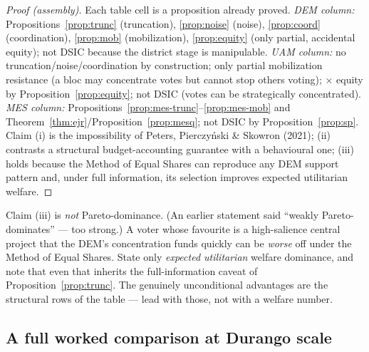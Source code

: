 \documentclass[11pt,letterpaper]{article}
\theoremstyle{definition}
\theoremstyle{plain}
\theoremstyle{remark}
\providecommand{\citet}[1]{Peters, Pierczy\'nski \& Skowron (2021)}
\begin{document}
\begin{proof}[Proof (assembly)]
Each table cell is a proposition already proved. \emph{DEM column:} Propositions~\ref{prop:trunc}
(truncation), \ref{prop:noise} (noise), \ref{prop:coord} (coordination), \ref{prop:mob}
(mobilization), \ref{prop:equity} (only partial, accidental equity); not DSIC because the district
stage is manipulable. \emph{UAM column:} no truncation/noise/coordination by construction; only
partial mobilization resistance (a bloc may concentrate votes but cannot stop others voting);
$\times$ equity by Proposition~\ref{prop:equity}; not DSIC (votes can be strategically concentrated).
\emph{MES column:} Propositions~\ref{prop:mes-trunc}--\ref{prop:mes-mob} and
Theorem~\ref{thm:ejr}/Proposition~\ref{prop:mesq}; not DSIC by Proposition~\ref{prop:sp}. Claim (i)
is the impossibility of \citet{peters2021}; (ii) contrasts a structural budget-accounting guarantee
with a behavioural one; (iii) holds because the Method of Equal Shares can reproduce any DEM support
pattern and, under full information, its selection improves expected utilitarian welfare.
\end{proof}

\begin{watchout}
Claim (iii) is \emph{not} Pareto-dominance. (An earlier statement said ``weakly Pareto-dominates''
--- too strong.) A voter whose favourite is a high-salience central project that the DEM's
concentration funds quickly can be \emph{worse} off under the Method of Equal Shares. State only
\emph{expected utilitarian} welfare dominance, and note that even that inherits the
full-information caveat of Proposition~\ref{prop:trunc}. The genuinely unconditional advantages are
the structural rows of the table --- lead with those, not with a welfare number.
\end{watchout}

\subsection{A full worked comparison at Durango scale}
\end{document}
